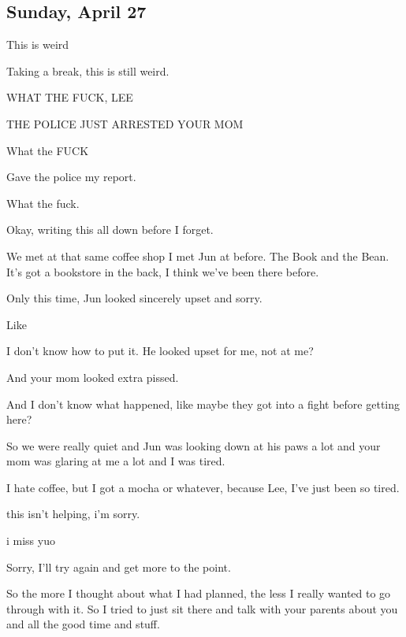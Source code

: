 {\newpage

\subsection*{Sunday, April 27}\label{sunday-april-27}

 This is weird

 Taking a break, this is still weird.

 WHAT THE FUCK, LEE

 THE POLICE JUST ARRESTED YOUR MOM

 What the FUCK

 Gave the police my report.

 What the fuck.

 Okay, writing this all down before I forget.

 We met at that same coffee shop I met Jun at before. The Book and the Bean. It's got a bookstore in the back, I think we've been there before.

 Only this time, Jun looked sincerely upset and sorry.

 Like

 I don't know how to put it. He looked upset for me, not at me?

 And your mom looked extra pissed.

 And I don't know what happened, like maybe they got into a fight before getting here?

 So we were really quiet and Jun was looking down at his paws a lot and your mom was glaring at me a lot and I was tired.

 I hate coffee, but I got a mocha or whatever, because Lee, I've just been so tired.

 this isn't helping, i'm sorry.

 i miss yuo

 Sorry, I'll try again and get more to the point.

 So the more I thought about what I had planned, the less I really wanted to go through with it. So I tried to just sit there and talk with your parents about you and all the good time and stuff.

}
